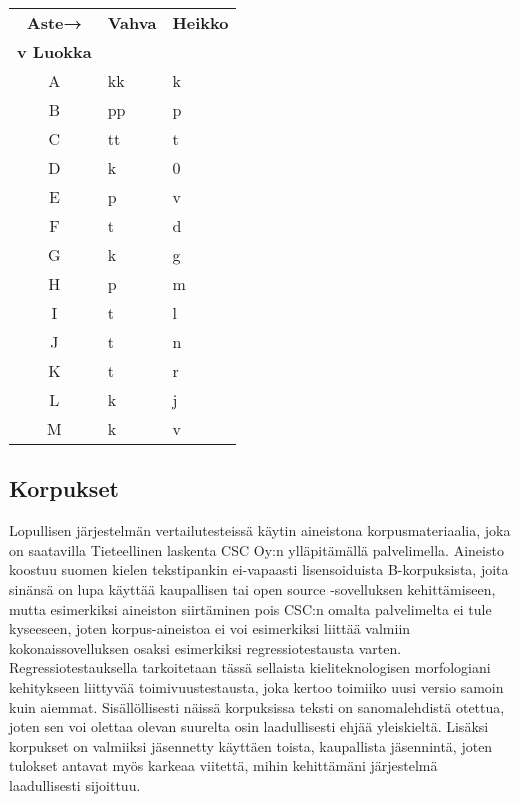 \documentclass[free]{flammie}
\begin{document}
\begin{table}
    \label{Astevaihteluluokkien vaihteluparit}
    \begin{tabular}{|c||l|l|}
        \hline
        \bf Aste→ & \bf Vahva & \bf Heikko \\
        \bf v Luokka & & \\
        \hline
        A & kk & k \\
        B & pp & p \\
        C & tt & t \\
        D & k & 0 \\
        E & p & v \\
        F & t & d \\
        G & k & g \\
        H & p & m \\
        I & t & l \\
        J & t & n \\
        K & t & r \\
        L & k & j \\
        M & k & v \\
        \hline
    \end{tabular}
\end{table}

\subsection{Korpukset}

Lopullisen järjestelmän vertailutesteissä käytin aineistona korpusmateriaalia, joka
on saatavilla Tieteellinen laskenta CSC Oy:n ylläpitämällä palvelimella. Aineisto koostuu suomen kielen tekstipankin ei-vapaasti lisensoiduista B-korpuksista,
joita sinänsä on lupa käyttää kaupallisen tai open source -sovelluksen kehittämiseen, mutta esimerkiksi aineiston siirtäminen pois CSC:n omalta palvelimelta
ei tule kyseeseen, joten korpus-aineistoa ei voi esimerkiksi liittää valmiin kokonaissovelluksen osaksi esimerkiksi regressiotestausta varten. Regressiotestauksella tarkoitetaan tässä sellaista kieliteknologisen morfologiani kehitykseen liittyvää
toimivuustestausta, joka kertoo toimiiko uusi versio samoin kuin aiemmat.
Sisällöllisesti näissä korpuksissa teksti on sanomalehdistä otettua, joten sen voi
olettaa olevan suurelta osin laadullisesti ehjää yleiskieltä. Lisäksi korpukset on
valmiiksi jäsennetty käyttäen toista, kaupallista jäsennintä, joten tulokset antavat
myös karkeaa viitettä, mihin kehittämäni järjestelmä laadullisesti sijoittuu.
\end{document}
